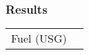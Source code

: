 \Large
\subsubsection*{Results}
  \begin{tabular}{p{2 cm}|p{2 cm}|}
  \cline{2-2}
  Fuel (USG)&\\
  \cline{2-2}
  \end{tabular}
  \normalsize
  
  